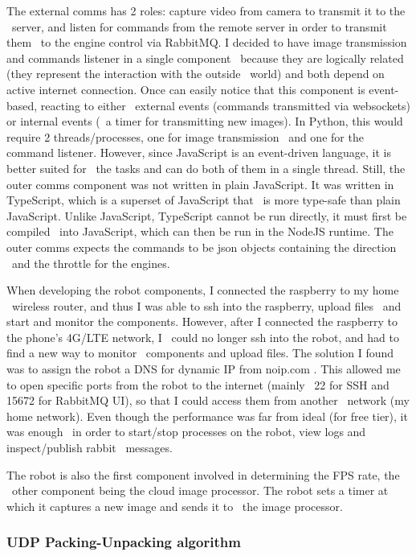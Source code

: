 The external comms has 2 roles: capture video from camera to transmit it to the \
server, and listen for commands from the remote server in order to transmit them \
to the engine control via RabbitMQ.
I decided to have image transmission and commands listener in a single component \
because they are logically related (they represent the interaction with the outside \
world) and both depend on active internet connection.
Once can easily notice that this component is event-based, reacting to either \
external events (commands transmitted via websockets) or internal events (\
a timer for transmitting new images).
In Python, this would require 2 threads/processes, one for image transmission \
and one for the command listener.
However, since JavaScript is an event-driven language, it is better suited for \
the tasks and can do both of them in a single thread.
Still, the outer comms component was not written in plain JavaScript.
It was written in TypeScript, which is a superset of JavaScript that \
is more type-safe than plain JavaScript.
Unlike JavaScript, TypeScript cannot be run directly, it must first be compiled \
into JavaScript, which can then be run in the NodeJS runtime.
The outer comms expects the commands to be json objects containing the direction \
and the throttle for the engines.


When developing the robot components, I connected the raspberry to my home \
wireless router, and thus I was able to ssh into the raspberry, upload files \
and start and monitor the components.
However, after I connected the raspberry to the phone's 4G/LTE network, I \
could no longer ssh into the robot, and had to find a new way to monitor \
components and upload files.
The solution I found was to assign the robot a DNS for dynamic IP from noip.com .
This allowed me to open specific ports from the robot to the internet (mainly \
22 for SSH and 15672 for RabbitMQ UI), so that I could access them from another \
network (my home network).
Even though the performance was far from ideal (for free tier), it was enough \
in order to start/stop processes on the robot, view logs and inspect/publish rabbit \
messages.

The robot is also the first component involved in determining the FPS rate, the \
other component being the cloud image processor.
The robot sets a timer at which it captures a new image and sends it to \
the image processor.

\subsubsection{UDP Packing-Unpacking algorithm}
\label{subsubsec:udp-packing-algorithm}

